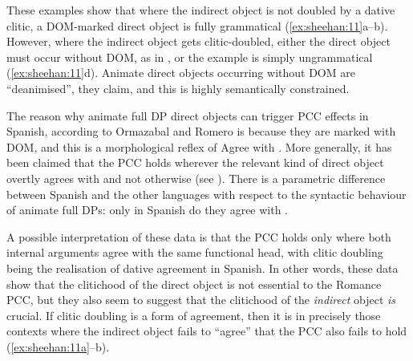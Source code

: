 \documentclass[output=paper,colorlinks,citecolor=brown,nonflat]{langsci/langscibook}
\begin{document}
These examples show that where the indirect object is not doubled by a dative clitic, a DOM-marked direct object is fully grammatical (\ref{ex:sheehan:11}a--b).
However, where the indirect object gets clitic-doubled, either the direct object must occur without DOM, as in , or the example is simply ungrammatical (\ref{ex:sheehan:11}d).
Animate direct objects occurring without DOM are ``deanimised'', they claim, and this is highly semantically constrained.

The reason why animate full DP direct objects can trigger PCC effects in Spanish, according to Ormazabal and Romero is because they are marked with DOM, and this is a morphological reflex of Agree with {\liv}. More generally, it has been claimed that the PCC holds wherever the relevant kind of direct object overtly agrees with {\liv} and not otherwise (see \citealt{Preminger2019}). There is a parametric difference between Spanish and the other languages with respect to the syntactic behaviour of animate full DPs: only in Spanish do they agree with {\liv}.

A possible interpretation of these data is that the PCC holds only where both internal arguments agree with the same functional head, with clitic doubling being the realisation of dative agreement in Spanish. In other words, these data show that the clitichood of the direct object is not essential to the Romance PCC, but they also seem to suggest that the clitichood of the \textit{indirect} object \textit{is} crucial. If clitic doubling is a form of agreement, then it is in precisely those contexts where the indirect object fails to ``agree'' that the PCC also fails to hold (\ref{ex:sheehan:11a}--b).
\end{document}
